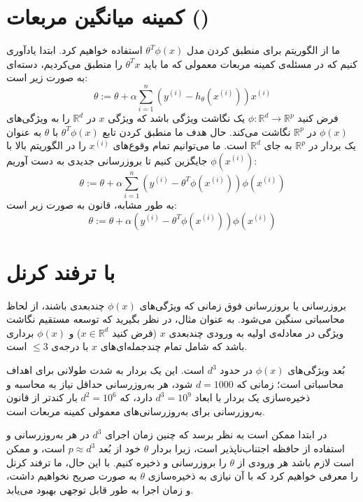\documentclass[12pt]{article}
\begin{document}
\section{کمینه میانگین مربعات ()}
ما از الگوریتم
برای منطبق کردن مدل
$\theta^T\phi(x)$
استفاده خواهیم کرد. ابتدا یادآوری کنیم که در مسئله‌ی کمینه مربعات معمولی که ما باید
$\theta^Tx$
را منطبق می‌کردیم،
دسته‌ای به صورت زیر است:
$$
\theta := \theta + \alpha\sum_{i=1}^{n}\left(y^{(i)} - h_\theta(x^{(i)})\right)x^{(i)}
$$
فرض کنید
$\phi : \mathbb{R}^d \rightarrow \mathbb{R}^p$
یک نگاشت ویژگی باشد که ویژگی
$x$
در
$\mathbb{R}^d$
را به ویژگی‌های
$\phi(x)$
در
$\mathbb{R}^p$
نگاشت می‌کند. حال هدف ما منطبق کردن تابع
$\theta^T\phi(x)$
با
$\theta$
به عنوان یک بردار در
$\mathbb{R}^p$
به جای
$\mathbb{R}^d$
است. ما می‌توانیم تمام وقوع‌های
$x^{(i)}$
را در الگوریتم بالا با
$\phi(x^{(i)})$
جایگزین کنیم تا بروزرسانی جدیدی به دست آوریم:
$$
\theta := \theta + \alpha\sum_{i=1}^{n}\left(y^{(i)} - \theta^T\phi(x^{(i)})\right)\phi(x^{(i)})
$$
به طور مشابه، قانون
به صورت زیر است:
$$
\theta := \theta + \alpha\left(y^{(i)} - \theta^T\phi(x^{(i)})\right)\phi(x^{(i)})
$$

\section{ با ترفند کرنل}

بروزرسانی
یا بروزرسانی
فوق زمانی که ویژگی‌های
$\phi(x)$
چندبعدی باشند، از لحاظ محاسباتی سنگین می‌شود. به عنوان مثال، در نظر بگیرید که توسعه مستقیم نگاشت ویژگی در معادله‌ی اولیه به ورودی چندبعدی
$x$
(فرض کنید
$x \in \mathbb{R}^d$) و
$\phi(x)$
برداری باشد که شامل تمام چندجمله‌ای‌های
$x$
با درجه‌ی
$\leq 3$
است.

بُعد ویژگی‌های
$\phi(x)$
در حدود
$d^3$
است. این یک بردار به شدت طولانی برای اهداف محاسباتی است؛ زمانی که
$d = 1000$
شود، هر به‌روزرسانی حداقل نیاز به محاسبه و ذخیره‌سازی یک بردار با ابعاد
$d^3 = 10^9$
دارد، که
$d^2 = 10^6$
بار کندتر از قانون به‌روزرسانی برای به‌روزرسانی‌های معمولی کمینه مربعات است.

در ابتدا ممکن است به نظر برسد که چنین زمان اجرای
$d^3$
در هر به‌روزرسانی و استفاده از حافظه اجتناب‌ناپذیر است، زیرا بردار
$\theta$
خود از بُعد
$p \approx d^3$
است، و ممکن است لازم باشد هر ورودی از
$\theta$
را بروزرسانی و ذخیره کنیم. با این حال، ما ترفند کرنل را معرفی خواهیم کرد که با آن نیازی به ذخیره‌سازی
$\theta$
به صورت صریح نخواهیم داشت، و زمان اجرا به طور قابل توجهی بهبود می‌یابد.
\end{document}
